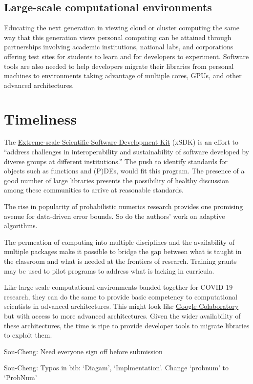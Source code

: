 \documentclass{amsart}
\newcommand{\SCTCNote}[1]{{\color{green}Sou-Cheng: #1}}
\begin{document}
\subsection{Large-scale computational environments}  
Educating the next generation in viewing cloud or cluster computing the same way that this generation views personal computing can be attained through partnerships involving academic institutions, national labs, and corporations offering test sites for students to learn and for developers to experiment.  Software tools are also needed to help developers migrate their libraries from personal machines to environments taking advantage of multiple cores, GPUs, and other advanced architectures.  



\section{Timeliness} %

The \href{https://xsdk.info}{Extreme-scale Scientific Software Development Kit} (xSDK) is an effort to ``address challenges in interoperability and sustainability of software developed by diverse groups at different institutions.'' The push to identify standards for objects such as functions and (P)DEs, would fit this program. The presence of a good number of large libraries presents the possibility of healthy discussion among these communities to arrive at reasonable standards.

The rise in popularity of probabilistic numerics research provides one promising avenue for data-driven error bounds.  So do the authors' work on adaptive algorithms.

The permeation of computing into multiple disciplines and the availability of multiple packages make it possible to bridge the gap between what is taught in the classroom and what is needed at the frontiers of research.  Training grants may be used to pilot programs to address what is lacking in curricula.

Like large-scale computational environments banded together for COVID-19 research, they can do the same to provide basic competency to computational scientists in advanced architectures.  This might look like \href{https://colab.research.google.com}{Google Colaboratory} but with access to more advanced architectures.  Given the wider availability of these architectures, the time is ripe to provide developer tools to migrate libraries to exploit them.

\printbibliography
%
%

\vspace{-1ex}

\SCTCNote{Need everyone sign off before submission}

\SCTCNote{Typos in bib: `Diagam', `Implmentation'. Change `probnum' to `ProbNum'}
\end{document}
